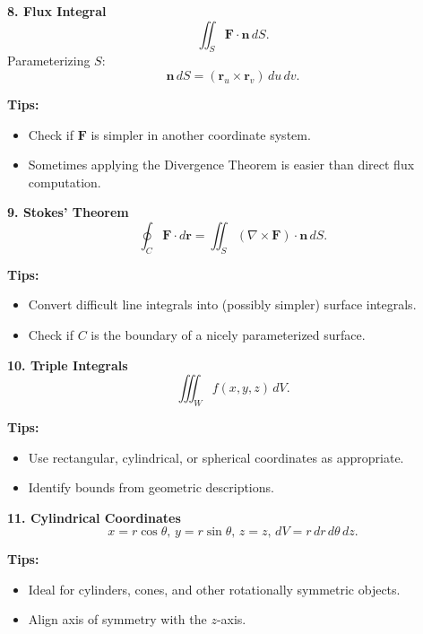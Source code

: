 \documentclass[9pt]{article}
\begin{document}
\begin{multicols}{2}
\begin{tcolorbox}[title=, colframe=brightyellow]
\textbf{8. Flux Integral}\\
\[
\iint_S \mathbf{F}\cdot\mathbf{n}\,dS.
\]
Parameterizing $S$: 
\[
\mathbf{n}\,dS=(\mathbf{r}_u\times\mathbf{r}_v)\,du\,dv.
\]

\textbf{Tips:}
\begin{itemize}
    \item Check if $\mathbf{F}$ is simpler in another coordinate system.
    \item Sometimes applying the Divergence Theorem is easier than direct flux computation.
\end{itemize}
\end{tcolorbox}

\begin{tcolorbox}[title=, colframe=brightblue]
\textbf{9. Stokes' Theorem}\\
\[
\oint_C \mathbf{F}\cdot d\mathbf{r}=\iint_S (\nabla \times \mathbf{F})\cdot \mathbf{n}\,dS.
\]

\textbf{Tips:}
\begin{itemize}
    \item Convert difficult line integrals into (possibly simpler) surface integrals.
    \item Check if $C$ is the boundary of a nicely parameterized surface.
\end{itemize}
\end{tcolorbox}

\begin{tcolorbox}[title=, colframe=brightgreen]
\textbf{10. Triple Integrals}\\
\[
\iiint_W f(x,y,z)\,dV.
\]

\textbf{Tips:}
\begin{itemize}
    \item Use rectangular, cylindrical, or spherical coordinates as appropriate.
    \item Identify bounds from geometric descriptions.
\end{itemize}
\end{tcolorbox}

\begin{tcolorbox}[title=, colframe=brightpink]
\textbf{11. Cylindrical Coordinates}\\
\[
x=r\cos\theta,\, y=r\sin\theta,\, z=z,\, dV=r\,dr\,d\theta\,dz.
\]

\textbf{Tips:}
\begin{itemize}
    \item Ideal for cylinders, cones, and other rotationally symmetric objects.
    \item Align axis of symmetry with the $z$-axis.
\end{itemize}
\end{tcolorbox}


\end{multicols}
\end{document}
